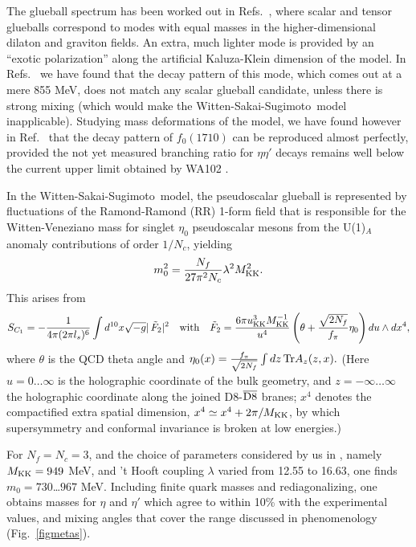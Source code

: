 \documentclass[a4paper]{PoS}
\newcommand{\be}{\begin{equation}}
\newcommand{\ee}{\end{equation}}
\newcommand{\6}{\partial }
\newcommand{\8}{T_{\rm D8}}
\newcommand{\MKK}{M_{\rm KK}}
\newcommand{\uKK}{u_{\rm KK}}
\def\WSS{Witten-Sakai-Sugimoto}
\begin{document}
The glueball spectrum has been worked out in Refs.~\cite{Constable:1999gb%
}, where scalar and tensor glueballs correspond to
modes with equal masses in the higher-dimensional dilaton and graviton fields. An extra, much lighter mode is
provided by an ``exotic polarization'' along the artificial Kaluza-Klein dimension of the model. In Refs.~\cite{Brunner:2015oqa,1504.05815,1510.07605}
we have found that the decay pattern of this mode, which comes out at a mere 855 MeV, does not match any scalar glueball candidate,
unless there is strong mixing (which would make the \WSS\ model inapplicable). Studying mass deformations of
the model, we have found however in Ref.~\cite{1510.07605} that the decay pattern of $f_0(1710)$ can be reproduced
almost perfectly, provided the not yet measured branching ratio for $\eta\eta'$ decays remains well below
the current upper limit obtained by WA102 \cite{Barberis:2000cd}.

In the \WSS\ model, the pseudoscalar glueball is represented by fluctuations of the Ramond-Ramond (RR) 1-form field that
is responsible for the Witten-Veneziano mass for singlet $\eta_0$ pseudoscalar mesons from the U(1)$_A$ anomaly
contributions of order $1/N_c$, yielding
\be\label{mWV2}
m_{0}^2=\frac{N_f}{27\pi^2 N_c}\lambda^2\MKK^2.
\ee
This arises from
\be
S_{C_1}=-\frac1{4\pi(2\pi l_s)^6}\int d^{10}x\sqrt{-g}|\,\tilde F_2|^2
\quad\mathrm{with}\quad
\tilde F_2=\frac{6\pi\uKK^3 \MKK^{-1}}{u^4}
\left(\theta+\frac{\sqrt{2N_f}}{f_\pi}\eta_0\right)du \wedge dx^4,
\ee
where $\theta$ is the QCD theta angle and
$
\eta_0(x)=\frac{f_\pi}{\sqrt{2N_f}}\int dz \,{\rm Tr} A_z(z,x).
$
(Here $u=0\ldots\infty$ is the holographic coordinate of the bulk geometry, and $z=-\infty\ldots\infty$ the holographic coordinate along the 
joined D8-$\overline{\rm D8}$ branes; $x^4$ denotes the compactified extra spatial dimension, $x^4\simeq x^4+2\pi/\MKK$, by which
supersymmetry and conformal invariance is broken at low energies.)

For $N_f=N_c=3$, and the choice of parameters considered
by us in \cite{Brunner:2015oqa,1504.05815}, namely $\MKK=949$ MeV, and 't Hooft coupling $\lambda$ varied from 12.55 to 16.63, one finds
$m_{0}=730$\ldots$967$ MeV.
Including finite quark masses and rediagonalizing, one obtains masses for $\eta$ and $\eta'$ which agree to within 10\%
with the experimental values, and mixing angles that cover the range discussed in phenomenology (Fig.~\ref{figmetas}).

\end{document}
